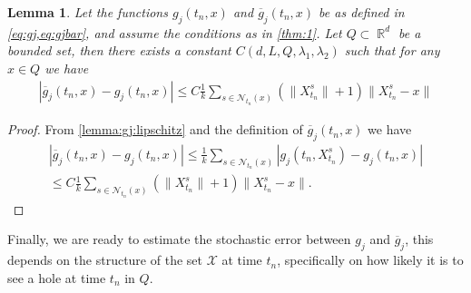 \documentclass[11pt,reqno,a4paper]{amsart}
\newtheorem{lemma}[theorem]{Lemma}
\theoremstyle{definition}
\numberwithin{equation}{section}
\newcommand{\widebar}[1]{\overline{#1}}
\DeclareMathOperator{\R}{\mathbb{R}}
\DeclareMathOperator{\1}{\mathbbm{1}}
\begin{document}
\begin{lemma}\label{lemma:lipthitz:bound}
  Let the functions $g_j(t_n,x)$ and $\widebar{g}_j(t_n,x)$ be as defined in \cref{eq:gj,eq:gjbar}, and assume the conditions as in \cref{thm:1}.
  Let $Q \subset \R^d$ be a bounded set, then there exists a constant $C(d, L, Q,\lambda_1,\lambda_2)$ such that for any $x \in Q$ we have
  \begin{align*}
    |\widebar{g}_j(t_n,x) - g_j(t_n,x)|
    \leq
    C \frac{1}{k} \sum_{s \in \mathcal{N}_{t_n}(x)} \left (\|X_{t_n}^{s}\| + 1 \right ) \|X_{t_n}^{s} - x\|
  \end{align*}
\end{lemma}
\begin{proof}
  From \cref{lemma:gj:lipschitz} and the definition of $\widebar{g}_j(t_n,x)$ we have
  \begin{align*}
    |\widebar{g}_j(t_n,x) - g_j(t_n,x)| \leq
    \frac{1}{k} \sum_{s \in \mathcal{N}_{t_n}(x)} |g_j(t_n,X_{t_n}^{s}) - g_j(t_n,x)| \\
    \leq
    C \frac{1}{k} \sum_{s \in \mathcal{N}_{t_n}(x)} \left (\|X_{t_n}^{s}\| + 1 \right ) \|X_{t_n}^{s} - x\|.
  \end{align*}
\end{proof}

Finally, we are ready to estimate the stochastic error between $g_j$ and $\widebar{g}_j$, this depends on the structure of the set $\mathcal{X}$ at time $t_n$, specifically on how likely it is to see a hole at time $t_n$ in $Q$.
\end{document}
